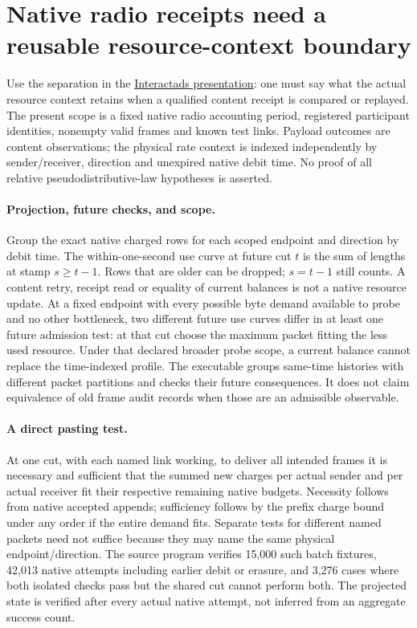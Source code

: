 \documentclass{article}
\begin{document}
\section*{Native radio receipts need a reusable resource-context boundary}
Use the separation in the
\href{https://github.com/eternal-november/eos-research-programmes/blob/4359a8a1484498b9c46d8e58a0112448a1fba06b/projects/contextual-composition/publications/interactads/Interactads.tex}{Interactads presentation}:
one must say what the actual resource context retains when a
qualified content receipt is compared or replayed. The present
scope is a fixed native radio accounting period, registered
participant identities, nonempty valid frames and known test
links. Payload outcomes are content observations; the physical
rate context is indexed independently by sender/receiver, direction
and unexpired native debit time. No proof of all relative
pseudodistributive-law hypotheses is asserted.

\paragraph{Projection, future checks, and scope.}
Group the exact native charged rows for each scoped endpoint and
direction by debit time. The within-one-second use curve at
future cut $t$ is the sum of lengths at stamp $s\ge t-1$.
Rows that are older can be dropped; $s=t-1$ still counts.
A content retry, receipt read or equality of current balances
is not a native resource update. At a fixed endpoint with every
possible byte demand available to probe and no other bottleneck,
two different future use curves differ in at least one future
admission test: at that cut choose the maximum packet fitting
the less used resource. Under that declared broader probe scope,
a current balance cannot replace the time-indexed profile.
The executable groups same-time histories with different packet
partitions and checks their future consequences. It does not
claim equivalence of old frame audit records when those are
an admissible observable.

\paragraph{A direct pasting test.}
At one cut, with each named link working, to deliver all intended
frames it is necessary and sufficient that the summed new charges
per actual sender and per actual receiver fit their respective
remaining native budgets. Necessity follows from native accepted
appends; sufficiency follows by the prefix charge bound under
any order if the entire demand fits. Separate tests for different
named packets need not suffice because they may name the same
physical endpoint/direction. The source program verifies
15,000 such batch fixtures, 42,013 native attempts including
earlier debit or erasure, and 3,276 cases where both isolated
checks pass but the shared cut cannot perform both. The projected
state is verified after every actual native attempt, not inferred
from an aggregate success count.
\end{document}
